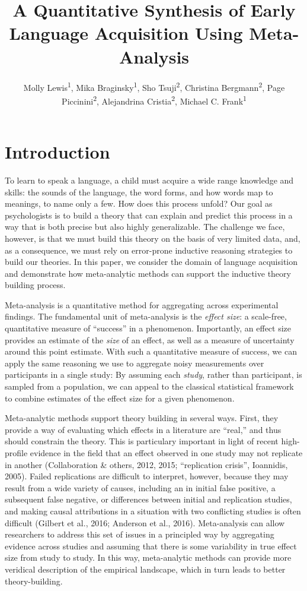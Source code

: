 \documentclass[english,floatsintext,man]{apa6}
\title{A Quantitative Synthesis of Early Language Acquisition Using
Meta-Analysis}
\author{
          Molly Lewis\textsuperscript{1},
          Mika Braginsky\textsuperscript{1},
          Sho Tsuji\textsuperscript{2},
          Christina Bergmann\textsuperscript{2},
          Page Piccinini\textsuperscript{2},
          Alejandrina Cristia\textsuperscript{2},
          Michael C. Frank\textsuperscript{1}  }
\affiliation{
    \vspace{0.5cm}
          \textsuperscript{1} Department Psychology, Stanford University\\
          \textsuperscript{2} Laboratoire de Sciences Cognitives et Psycholinguistique, ENS  }
\begin{document}
\maketitle



\section{Introduction}\label{introduction}

To learn to speak a language, a child must acquire a wide range
knowledge and skills: the sounds of the language, the word forms, and
how words map to meanings, to name only a few. How does this process
unfold? Our goal as psychologists is to build a theory that can explain
and predict this process in a way that is both precise but also highly
generalizable. The challenge we face, however, is that we must build
this theory on the basis of very limited data, and, as a consequence, we
must rely on error-prone inductive reasoning strategies to build our
theories. In this paper, we consider the domain of language acquisition
and demonstrate how meta-analytic methods can support the inductive
theory building process.

Meta-analysis is a quantitative method for aggregating across
experimental findings. The fundamental unit of meta-analysis is the
\emph{effect size}: a scale-free, quantitative measure of
\enquote{success} in a phenomenon. Importantly, an effect size provides
an estimate of the \emph{size} of an effect, as well as a measure of
uncertainty around this point estimate. With such a quantitative measure
of success, we can apply the same reasoning we use to aggregate noisy
measurements over participants in a single study: By assuming each
\emph{study}, rather than participant, is sampled from a population, we
can appeal to the classical statistical framework to combine estimates
of the effect size for a given phenomenon.

Meta-analytic methods support theory building in several ways. First,
they provide a way of evaluating which effects in a literature are
\enquote{real,} and thus should constrain the theory. This is
particulary important in light of recent high-profile evidence in the
field that an effect observed in one study may not replicate in another
(Collaboration \& others, 2012, 2015; ``replication crisis'', Ioannidis,
2005). Failed replications are difficult to interpret, however, because
they may result from a wide variety of causes, including an in initial
false positive, a subsequent false negative, or differences between
initial and replication studies, and making causal attributions in a
situation with two conflicting studies is often difficult (Gilbert et
al., 2016; Anderson et al., 2016). Meta-analysis can allow researchers
to address this set of issues in a principled way by aggregating
evidence across studies and assuming that there is some variability in
true effect size from study to study. In this way, meta-analytic methods
can provide more veridical description of the empirical landscape, which
in turn leads to better theory-building.
\end{document}

